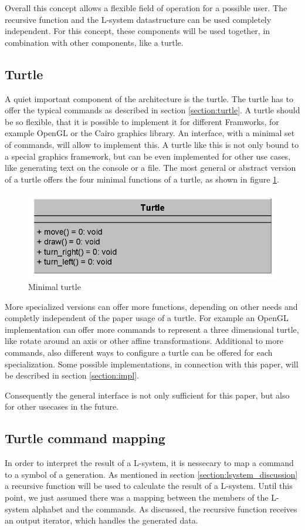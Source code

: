 \documentclass[english]{cpp-hmwk}
\begin{document}
Overall this concept allows a flexible field of operation for a possible user. The recursive function and the L-system datastructure can be used completely independent. For this concept, these components will be used together, in combination with other components, like a turtle.

\subsection{Turtle}
A quiet important component of the architecture is the turtle. The turtle has to offer the typical commands as described in section \ref{section:turtle}. A turtle should be so flexible, that it is possible to implement it for different Framworks, for example OpenGL or the Cairo graphics library. An interface, with a minimal set of commands, will allow to implement this. A turtle like this is not only bound to a special graphics framework, but can be even implemented for other use cases, like generating text on the console or a file.
The most general or abstract version of a turtle offers the four minimal functions of a turtle, as shown in figure \ref{figure:minimal_turtle}.

\begin{figure}[h!]
	\centering
	\includegraphics[width=0.6\columnwidth]{../graphs/class_simple_turtle.png}
	\caption{Minimal turtle}
	\label{figure:minimal_turtle}
\end{figure}

\medskip
\noindent More specialized versions can offer more functions, depending on other needs and completly independent of the paper usage of a turtle. For example an OpenGL implementation can offer more commands to represent a three dimensional turtle, like rotate around an axis or other affine transformations. Additional to more commands, also different ways to configure a turtle can be offered for each specialization. Some possible implementations, in connection with this paper, will be described in section \ref{section:impl}.

Consequently the general interface is not only sufficient for this paper, but also for other usecases in the future.

\subsection{Turtle command mapping}
\label{section:turtle_mapping}
In order to interpret the result of a L-system, it is nessecary to map a command to a symbol of a generation. As mentioned in section \ref{section:lsystem_discussion} a recursive function will be used to calculate the result of a L-system. Until this point, we just assumed there was a mapping between the members of the L-system alphabet and the commands. As discussed, the recursive function receives an output  iterator, which handles the generated data. 
\end{document}
